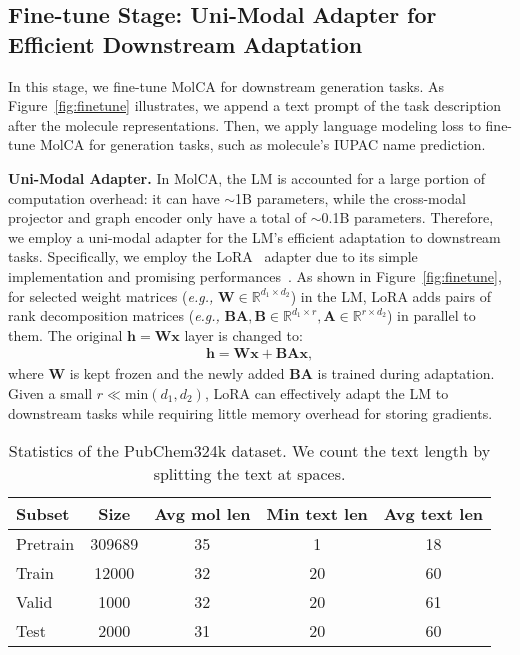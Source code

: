 \documentclass[11pt]{article}
\newcommand{\eg}{\emph{e.g., }}
\newcommand{\Mat}[1]{\textbf{#1}}
\newcommand{\Vtr}[1]{\boldsymbol{#1}}
\begin{document}
\subsection{Fine-tune Stage: Uni-Modal Adapter for Efficient Downstream Adaptation}
\label{sec:fine-tune}
In this stage, we fine-tune MolCA for downstream generation tasks. As Figure~\ref{fig:finetune} illustrates, we append a text prompt of the task description after the molecule representations. Then, we apply language modeling loss to fine-tune MolCA for generation tasks, such as molecule's IUPAC name prediction. 

\textbf{Uni-Modal Adapter.} In MolCA, the LM is accounted for a large portion of computation overhead: it can have $\sim$1B parameters, while the cross-modal projector and graph encoder only have a total of $\sim$0.1B parameters. 
Therefore, we employ a uni-modal adapter for the LM's efficient adaptation to downstream tasks. Specifically, we employ the LoRA~\citep{LoRA} adapter due to its simple implementation and promising performances~\citep{DBLP:conf/nips/LiuTMMHBR22}. As shown in Figure~\ref{fig:finetune}, for selected weight matrices (\eg $\Mat{W} \in \mathbb{R}^{d_1\times d_2}$) in the LM, LoRA adds pairs of rank decomposition matrices (\eg $\Mat{BA}, \Mat{B}\in \mathbb{R}^{d_1\times r}, \Mat{A}\in \mathbb{R}^{r\times d_2}$) in parallel to them. The original $\Vtr{h}=\Mat{W}\Vtr{x}$ layer is changed to:
\begin{gather}
 \Vtr{h}=\Mat{W}\Vtr{x} + \Mat{BA}\Vtr{x},
\end{gather}
where $\Mat{W}$ is kept frozen and the newly added $\Mat{BA}$ is trained during adaptation. Given a small $r\ll \text{min}(d_1, d_2)$, LoRA can effectively adapt the LM to downstream tasks while requiring little memory overhead for storing gradients. 



%
 \begin{table}[t]
\small
\centering
\setlength{\tabcolsep}{3pt}
\begin{tabular}{lcccc}\toprule
Subset   & Size & Avg mol len & Min text len & Avg text len \\\midrule
Pretrain & 309689               & 35                  & 1               & 18              \\
Train    & 12000                & 32                  & 20              & 60              \\
Valid    & 1000                 & 32                  & 20              & 61              \\
Test     & 2000                 & 31                  & 20              & 60 \\\bottomrule
\end{tabular}
\caption{Statistics of the PubChem324k dataset. We count the text length by splitting the text at spaces.}
\label{tab:statistics}
 \vspace{-4mm}
\end{table}
\end{document}
